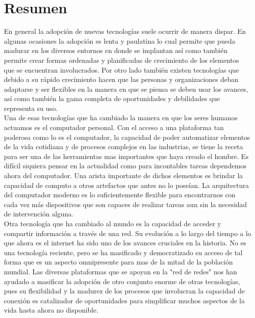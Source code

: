 \chapter*{Resumen}
En general la adopción de nuevas tecnologías suele ocurrir de manera dispar. En algunas ocasiones la adopción es lenta y paulatina lo cual permite que pueda madurar en los diversos entornos en donde se implantan así como también permite crear formas ordenadas y planificadas de crecimiento de los elementos que se encuentran involucrados. Por otro lado también existen tecnologías que debido a su rápido crecimiento hacen que las personas y organizaciones deban adaptarse y ser flexibles en la manera en que se piensa se deben usar los avances, así como también la gama completa de oportunidades y debilidades que representa su uso.\\ 

Una de esas tecnologías que ha cambiado la manera en que los seres humanos actuamos es el computador personal. Con el acceso a una plataforma tan poderosa como lo es el computador, la capacidad de poder automatizar elementos de la vida cotidiana y de procesos complejos en las industrias, se tiene la receta para ser una de las herramientas mas importantes que haya creado el hombre. Es difícil siquiera pensar en la actualidad como para incontables tareas dependemos ahora del computador. Una arista importante de dichos elementos es brindar la capacidad de computo a otros artefactos que antes no lo poseían. La arquitectura del computador moderno es lo suficientemente flexible para encontrarnos con cada vez más dispositivos que son capaces de realizar tareas aun sin la necesidad de intervención alguna.\\

Otra tecnología que ha cambiado al mundo es la capacidad de acceder y compartir información a través de una red. Su evolución a lo largo del tiempo a lo que ahora es el internet ha sido uno de los avances cruciales en la historia. No es una tecnología reciente, pero se ha masificado y democratizado su acceso de tal forma que es un aspecto omnipresente para mas de la mitad de la población mundial. Las diversas plataformas que se apoyan en la "red de redes" nos han ayudado a masificar la adopción de otro conjunto enorme de otras tecnologías, pues su flexibilidad y la madurez de los procesos que involucran la capacidad de conexión es catalizador de oportunidades para simplificar muchos aspectos de la vida hasta ahora no disponible.\\

